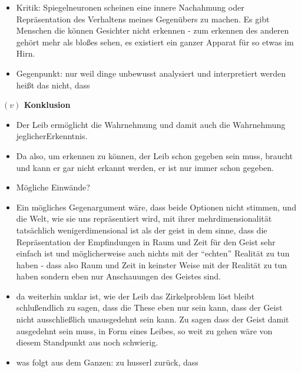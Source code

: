 \documentclass[a4paper, 12pt]{article}
\begin{document}
\begin{onehalfspace}
\begin{itemize}
  \item Kritik: Spiegelneuronen scheinen eine innere Nachahmung oder Repräsentation des Verhaltens meines Gegenübers zu machen. Es gibt Menschen die können Gesichter nicht erkennen - zum erkennen des anderen gehört mehr als bloßes sehen, es existiert ein ganzer Apparat für so etwas im Hirn. 
  \item Gegenpunkt: nur weil dinge unbewusst analysiert und interpretiert werden heißt das nicht, dass  
\end{itemize}



\vspace{5mm}
\noindent\textbf{$(v)$ Konklusion}

\begin{itemize}
  \item Der Leib ermöglicht die Wahrnehmung und damit auch die Wahrnehmung jeglicherErkenntnis.
  \item Da also, um erkennen zu können, der Leib schon gegeben sein muss, braucht und kann er gar nicht erkannt werden, er ist nur immer schon gegeben.
  \item Mögliche Einwände?
  \item Ein mögliches Gegenargument wäre, dass beide Optionen nicht stimmen, und die Welt, wie sie uns repräsentiert wird, mit ihrer mehrdimensionalität tatsächlich wenigerdimensional ist als der geist in dem sinne, dass die Repräsentation der Empfindungen in Raum und Zeit für den Geist sehr einfach ist und möglicherweise auch nichts mit der "`echten"' Realität zu tun haben - dass also Raum und Zeit in keinster Weise mit der Realität zu tun haben sondern eben nur Anschauungen des Geistes sind.
  \item da weiterhin unklar ist, wie der Leib das Zirkelproblem löst bleibt schlußendlich zu sagen, dass die These eben nur sein kann, dass der Geist nicht ausschließlich unausgedehnt sein kann. Zu sagen dass der Geist damit ausgedehnt sein muss, in Form eines Leibes, so weit zu gehen wäre von diesem Standpunkt aus noch schwierig.
  \item was folgt aus dem Ganzen: zu husserl zurück, dass 
\end{itemize}



\end{onehalfspace}
\end{document}
